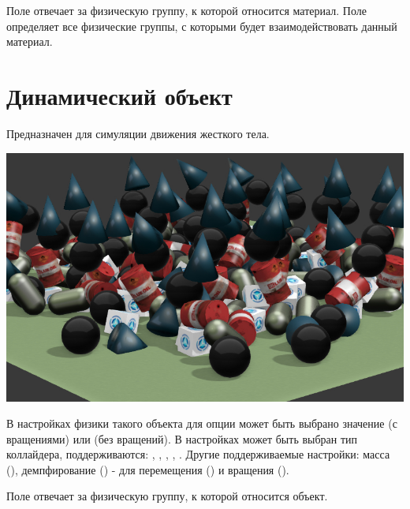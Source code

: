 \documentclass[a4paper,12pt,oneside]{sphinxmanual}
\begin{document}
\begin{DUlineblock}{0em}
\item[] 
\end{DUlineblock}

Поле  отвечает за физическую группу, к которой относится материал.
Поле  определяет все физические группы, с которыми будет взаимодействовать данный материал.


\section{Динамический объект}
\label{physics:id4}
Предназначен для симуляции движения жесткого тела.

\includegraphics[width=1.000\linewidth]{physics_dynamic.jpg}

\begin{DUlineblock}{0em}
\item[] 
\end{DUlineblock}

В настройках физики такого объекта для опции  может быть выбрано значение  (с вращениями) или  (без вращений). В настройках  может быть выбран тип коллайдера, поддерживаются: , , , , . Другие поддерживаемые настройки: масса (), демпфирование () - для перемещения () и вращения ().

Поле  отвечает за физическую группу, к которой относится объект.
\end{document}
